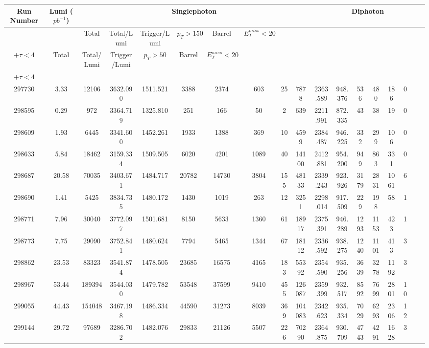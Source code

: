 \documentclass[10pt]{extarticle}
\begin{document}
\begin{longtable}{|c|c|c|c|c|c|c|c|c|c|c|c|c|c|c|c|c|c|}
\hline 
Run Number & Lumi ($pb^{-1}$) & \multicolumn{8}{|c|}{Singlephoton} & \multicolumn{8}{|c|}{Diphoton} \\ 
\hline 
 & & Total & Total/Lumi & Trigger/Lumi & $p_{T} > 150$ & Barrel & $E_{T}^{miss} < 20$ & \begin{tabular}{@{}c@{}} $E_{T}^{miss} > 75$ \\ $+ \tau < 4$ \end{tabular} & Total & Total/Lumi & Trigger/Lumi & $p_{T} > 50$ & Barrel & $E_{T}^{miss} < 20$ & \begin{tabular}{@{}c@{}} $E_{T}^{miss} > 75$ \\ $+ \tau < 4$ \end{tabular} \\ 
\hline 
297730&3.33&12106&3632.090&1511.521&3388&2374&603&25&7878&2363.589&948.376&536&480&186&0 \\ 
\hline 
298595&0.29&972&3364.719&1325.810&251&166&50&2&639&2211.991&872.335&43&38&19&0 \\ 
\hline 
298609&1.93&6445&3341.600&1452.261&1933&1388&369&10&4599&2384.487&946.225&332&299&106&0 \\ 
\hline 
298633&5.84&18462&3159.334&1509.505&6020&4201&1089&40&14100&2412.881&954.200&949&863&331&0 \\ 
\hline 
298687&20.58&70035&3403.671&1484.717&20782&14730&3804&155&48133&2339.243&923.926&3179&2831&1061&6 \\ 
\hline 
298690&1.41&5425&3834.735&1480.172&1430&1019&263&12&3251&2298.014&917.509&229&198&58&1 \\ 
\hline 
298771&7.96&30040&3772.097&1501.681&8150&5633&1360&61&18917&2375.391&946.289&1293&1153&423&1 \\ 
\hline 
298773&7.75&29090&3752.841&1480.624&7794&5465&1344&67&18112&2336.592&938.275&1240&1101&413&3 \\ 
\hline 
298862&23.53&83323&3541.874&1478.505&23685&16575&4165&183&55392&2354.590&935.256&3639&3278&1192&3 \\ 
\hline 
298967&53.44&189394&3544.030&1479.782&53548&37599&9410&455&126087&2359.399&932.517&8592&7699&2801&10 \\ 
\hline 
299055&44.43&154048&3467.198&1486.334&44590&31273&8039&369&104083&2342.623&935.334&7029&6293&2306&12 \\ 
\hline 
299144&29.72&97689&3286.702&1482.076&29833&21126&5507&226&70290&2364.875&930.709&4743&4291&1628&3 \\ 

\end{longtable}
\end{document}
